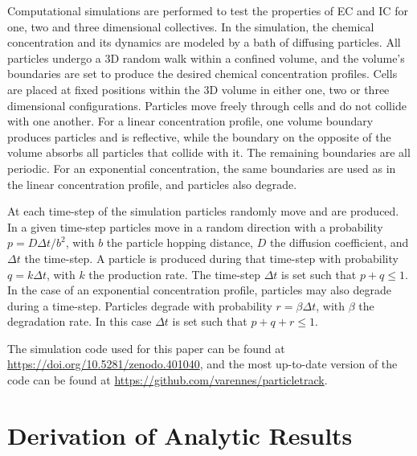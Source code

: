 Computational simulations are performed to test the properties of EC and IC for one, two and three dimensional collectives. In the simulation, the chemical concentration and its dynamics are modeled by a bath of diffusing particles. All particles undergo a 3D random walk within a confined volume, and the volume's boundaries are set to produce the desired chemical concentration profiles. Cells are placed at fixed positions within the 3D volume in either one, two or three dimensional configurations. Particles move freely through cells and do not collide with one another. For a linear concentration profile, one volume boundary produces particles and is reflective, while the boundary on the opposite of the volume absorbs all particles that collide with it. The remaining boundaries are all periodic. For an exponential concentration, the same boundaries are used as in the linear concentration profile, and particles also degrade.

At each time-step of the simulation particles randomly move and are produced. In a given time-step particles move in a random direction with a probability
$p = D\Delta t/b^2$,
with $b$ the particle hopping distance, $D$ the diffusion coefficient, and $\Delta t$ the time-step. A particle is produced during that time-step with probability
$q = k\Delta t$,
with $k$ the production rate. The time-step $\Delta t$ is set such that $p + q \leq 1$. In the case of an exponential concentration profile, particles may also degrade during a time-step. Particles degrade with probability
$r = \beta \Delta t$, with $\beta$ the degradation rate. In this case $\Delta t$ is set such that $p + q + r \leq 1$.

The simulation code used for this paper can be found at \url{https://doi.org/10.5281/zenodo.401040}, and the most up-to-date version of the code can be found at \url{https://github.com/varennes/particletrack}.


\section{Derivation of Analytic Results} \label{sct:ch3_SI}


